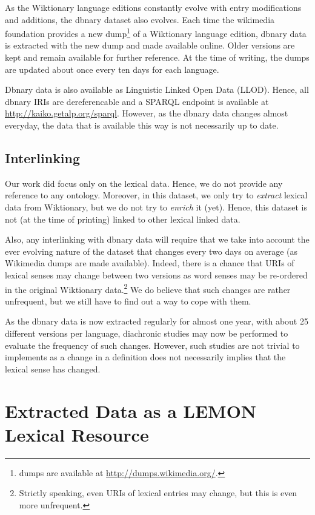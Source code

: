 \documentclass[sw]{iosart2c}
\begin{document}
As the Wiktionary language editions constantly evolve with entry modifications and additions, the dbnary dataset also evolves. Each time the wikimedia foundation provides a new dump\footnote{dumps are available at \url{http://dumps.wikimedia.org/}.} of a Wiktionary language edition, dbnary data is extracted with the new dump and made available online. Older versions are kept and remain available for further reference. At the time of writing, the dumps are updated about once every ten days for each language. 

Dbnary data is also available as Linguistic Linked Open Data (LLOD). Hence, all dbnary IRIs are dereferencable and a SPARQL endpoint is available at \url{http://kaiko.getalp.org/sparql}. However, as the dbnary data changes almost everyday, the data that is available this way is not necessarily up to date.

\subsection{Interlinking}

Our work did focus only on the lexical data. Hence, we do not provide any reference to any ontology. Moreover, in this dataset, we only try to \emph{extract} lexical data from Wiktionary, but we do not try to \emph{enrich} it (yet). Hence, this dataset is not (at the time of printing) linked to other lexical linked data. 

Also, any interlinking with dbnary data will require that we take into account the ever evolving nature of the dataset that changes every two days on average (as Wikimedia dumps are made available). Indeed, there is a chance that URIs of lexical senses may change between two versions as word senses may be re-ordered in the original Wiktionary data.\footnote{Strictly speaking, even URIs of lexical entries may change, but this is even more unfrequent.} We do believe that such changes are rather unfrequent, but we still have to find out a way to cope with them. 

As the dbnary data is now extracted regularly for almost one year, with about 25 different versions per language, diachronic studies may now be performed to evaluate the frequency of such changes. However, such studies are not trivial to implements as a change in a definition does not necessarily implies that the lexical sense has changed.

\section{Extracted Data as a LEMON Lexical Resource}
\end{document}
